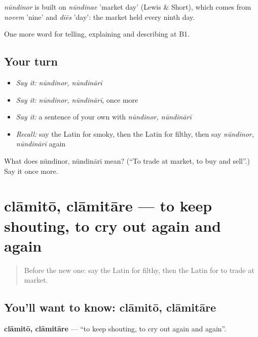 \begin{cousinweb}
\emph{nūndinor} is built on \emph{nūndinae} 'market day' (Lewis \& Short), which comes from \emph{novem} 'nine' and \emph{diēs} 'day': the market held every ninth day.
\end{cousinweb}

\begin{grammarlens}[title={What you've built}]
One more word for telling, explaining and describing at B1.
\end{grammarlens}

\subsection*{Your turn}
\begin{itemize}
\raggedright
  \item \emph{Say it:} \emph{nūndinor, nūndinārī}
  \item \emph{Say it:} \emph{nūndinor, nūndinārī}, once more
  \item \emph{Say it:} a sentence of your own with \emph{nūndinor, nūndinārī}
  \item \emph{Recall:} say the Latin for smoky, then the Latin for filthy, then say \emph{nūndinor, nūndinārī} again
\end{itemize}

\begin{tcolorbox}[breakable,colback=teal!4,colframe=teal!35!black,title={Before you move on}]
What does nūndinor, nūndinārī mean? (\textquotedblleft{}To trade at market, to buy and sell\textquotedblright{}.) Say it once more.
\end{tcolorbox}
\section[clāmitō, clāmitāre]{clāmitō, clāmitāre — to keep shouting, to cry out again and again}

\label{lesson:LA-C462-clamito}



\begin{quote}
Before the new one: say the Latin for filthy, then the Latin for to trade at market.
\end{quote}

\subsection*{You'll want to know: clāmitō, clāmitāre}
\textbf{clāmitō, clāmitāre} — \textquotedblleft{}to keep shouting, to cry out again and again\textquotedblright{}.

